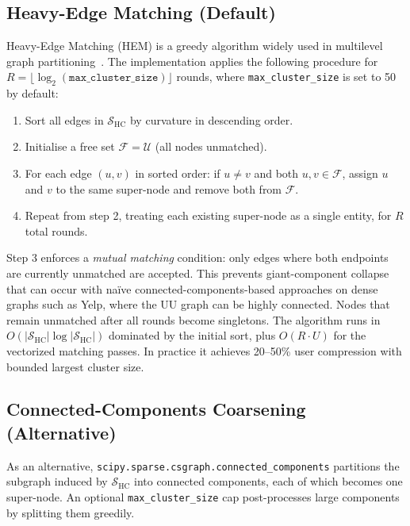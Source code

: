 \subsection{Heavy-Edge Matching (Default)}
\label{sec:hem}

Heavy-Edge Matching (HEM) is a greedy algorithm widely used in multilevel graph partitioning~\cite{karypis1998fast}. The implementation applies the following procedure for $R = \lfloor \log_2(\texttt{max\_cluster\_size}) \rfloor$ rounds, where \texttt{max\_cluster\_size} is set to 50 by default:

\begin{enumerate}
    \item Sort all edges in $\mathcal{S}_\text{HC}$ by curvature in descending order.
    \item Initialise a free set $\mathcal{F} = \mathcal{U}$ (all nodes unmatched).
    \item For each edge $(u, v)$ in sorted order: if $u \neq v$ and both $u, v \in \mathcal{F}$, assign $u$ and $v$ to the same super-node and remove both from $\mathcal{F}$.
    \item Repeat from step 2, treating each existing super-node as a single entity, for $R$ total rounds.
\end{enumerate}

Step 3 enforces a \emph{mutual matching} condition: only edges where both endpoints are currently unmatched are accepted. This prevents giant-component collapse that can occur with na\"ive connected-components-based approaches on dense graphs such as Yelp, where the UU graph can be highly connected. Nodes that remain unmatched after all rounds become singletons. The algorithm runs in $O(|\mathcal{S}_\text{HC}| \log |\mathcal{S}_\text{HC}|)$ dominated by the initial sort, plus $O(R \cdot U)$ for the vectorized matching passes. In practice it achieves 20--50\% user compression with bounded largest cluster size.

\subsection{Connected-Components Coarsening (Alternative)}

As an alternative, \texttt{scipy.sparse.csgraph.connected\_components} partitions the subgraph induced by $\mathcal{S}_\text{HC}$ into connected components, each of which becomes one super-node. An optional \texttt{max\_cluster\_size} cap post-processes large components by splitting them greedily.

